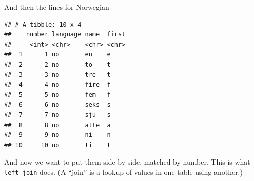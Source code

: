 \documentclass[
  ignorenonframetext,
]{beamer}
\newenvironment{Shaded}{\begin{snugshade}}{\end{snugshade}}
\newcommand{\KeywordTok}[1]{\textcolor[rgb]{0.13,0.29,0.53}{\textbf{#1}}}
\newcommand{\NormalTok}[1]{#1}
\newcommand{\OperatorTok}[1]{\textcolor[rgb]{0.81,0.36,0.00}{\textbf{#1}}}
\newcommand{\StringTok}[1]{\textcolor[rgb]{0.31,0.60,0.02}{#1}}
\begin{document}
\begin{frame}[fragile]{And then the lines for Norwegian}
\protect\hypertarget{and-then-the-lines-for-norwegian}{}

\footnotesize

\begin{Shaded}
\end{Shaded}

\begin{verbatim}
## # A tibble: 10 x 4
##    number language name  first
##     <int> <chr>    <chr> <chr>
##  1      1 no       en    e    
##  2      2 no       to    t    
##  3      3 no       tre   t    
##  4      4 no       fire  f    
##  5      5 no       fem   f    
##  6      6 no       seks  s    
##  7      7 no       sju   s    
##  8      8 no       atte  a    
##  9      9 no       ni    n    
## 10     10 no       ti    t
\end{verbatim}

\normalsize

And now we want to put them side by side, matched by number. This is
what \texttt{left\_join} does. (A ``join'' is a lookup of values in one
table using another.)

\end{frame}
\end{document}
